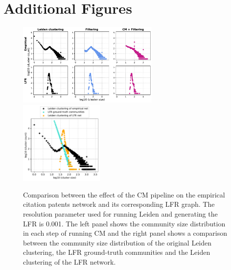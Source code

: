 \documentclass[a4paper]{article}   	%
\begin{document}
\section{Additional Figures}

\begin{figure}[h!]
\centering
\includegraphics[width=0.62\textwidth]{figs/cit_patents_cm_steps_lfr001.pdf}
\includegraphics[width=0.37\textwidth]{figs/cit_patents_001_cm_size.pdf}
\caption[CM pipeline on the empirical citation patents network and its model LFR graph for r=0.001]{Comparison between the effect of the CM pipeline on the empirical citation patents network and its corresponding LFR graph. The resolution parameter used for running Leiden and generating the LFR is 0.001. The left panel shows the community size distribution in each step of running CM and the right panel shows a comparison between the community size distribution of the original Leiden clustering, the LFR ground-truth communities and the Leiden clustering of the LFR network.}
\label{fig:2cliques}
\end{figure}
\end{document}
